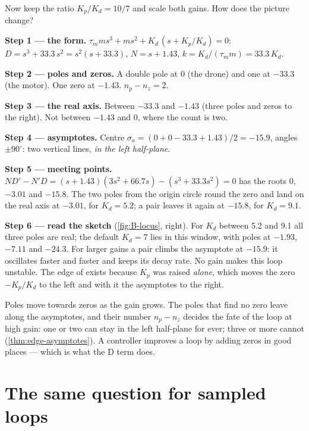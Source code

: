 \begin{example}
\label{ex:B-locus-ratio}
Now keep the ratio $K_p/K_d = 10/7$ and scale both gains. How does the picture change?

\textbf{Step 1 — the form.} $\tau_m m s^3 + m s^2 + K_d\,(s + K_p/K_d) = 0$: $D = s^3 + 33.3\,s^2 = s^2(s + 33.3)$, $N = s + 1.43$, $k = K_d/(\tau_m m) = 33.3\,K_d$.

\textbf{Step 2 — poles and zeros.} A double pole at $0$ (the drone) and one at $-33.3$ (the motor). One zero at $-1.43$. $n_p - n_z = 2$.

\textbf{Step 3 — the real axis.} Between $-33.3$ and $-1.43$ (three poles and zeros to the right). Not between $-1.43$ and $0$, where the count is two.

\textbf{Step 4 — asymptotes.} Centre $\sigma_a = (0 + 0 - 33.3 + 1.43)/2 = -15.9$, angles $\pm 90^\circ$: two vertical lines, \emph{in the left half-plane}.

\textbf{Step 5 — meeting points.} $N D' - N' D = (s + 1.43)(3s^2 + 66.7s) - (s^3 + 33.3s^2) = 0$ has the roots $0$, $-3.01$ and $-15.8$. The two poles from the origin circle round the zero and land on the real axis at $-3.01$, for $K_d = 5.2$; a pair leaves it again at $-15.8$, for $K_d = 9.1$.

\textbf{Step 6 — read the sketch} (\cref{fig:B-locus}, right). For $K_d$ between 5.2 and 9.1 all three poles are real; the default $K_d = 7$ lies in this window, with poles at $-1.93$, $-7.11$ and $-24.3$. For larger gains a pair climbs the asymptote at $-15.9$: it oscillates faster and faster and keeps its decay rate. No gain makes this loop unstable. The edge of  exists because $K_p$ was raised \emph{alone}, which moves the zero $-K_p/K_d$ to the left and with it the asymptotes to the right.
\end{example}

\begin{keyidea}
Poles move towards zeros as the gain grows. The poles that find no zero leave along the asymptotes, and their number $n_p - n_z$ decides the fate of the loop at high gain: one or two can stay in the left half-plane for ever; three or more cannot (\cref{thm:edge-asymptotes}). A controller improves a loop by adding zeros in good places — which is what the D term does.
\end{keyidea}

\section{The same question for sampled loops}

